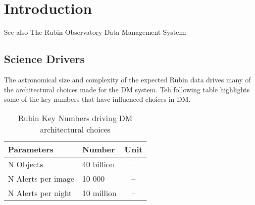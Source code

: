 \section{Introduction}

 See also The Rubin Observatory  Data Management System: \cite{2015arXiv151207914J}


\subsection{Science Drivers} 
The astronomical size and complexity of the expected Rubin data drives many of the architectural choices made for the DM system. Teh following table highlights some of the key numbers that have influenced choices in DM. 

\begin{table}[ht]
\caption{Rubin Key Numbers driving DM architectural choices} 
\label{tab:dm_keynumbers}
\begin{center}       
\begin{tabular}{|l|l|c|} %

\hline
\rule[-1ex]{0pt}{3.5ex}  {\bf Parameters} & {\bf Number} & {\bf Unit}\\
\hline
N Objects & 40 billion & -- \\
N Alerts per image & 10 000 & -- \\
N Alerts per night & 10 million & -- \\
\hline
\end{tabular}
\end{center}
\end{table} 

